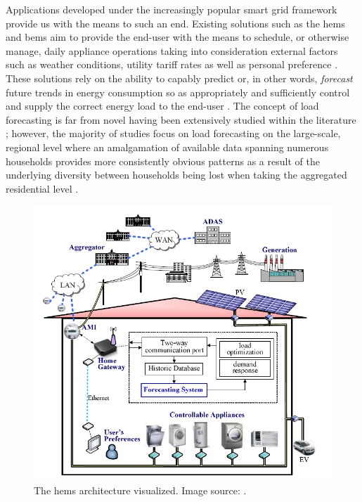 \noindent \newline Applications developed under the increasingly popular smart grid framework provide us with the means to such an end. Existing solutions such as the \gls{hems} and \gls{bems} aim to provide the end-user with the means to schedule, or otherwise manage, daily appliance operations taking into consideration external factors such as weather conditions, utility tariff rates as well as personal preference \cite{Yildiz}. These solutions rely on the ability to capably predict or, in other words, \textit{forecast} future trends in energy consumption \cite{Kareem} so as appropriately and sufficiently control and supply the correct energy load to the end-user \cite{Raza}. The concept of load forecasting is far from novel having been extensively studied within the literature \cite{Foucquier}; however, the majority of studies focus on load forecasting on the large-scale, regional level where an amalgamation of available data spanning numerous households provides more consistently obvious patterns as a result of the underlying diversity between households being lost when taking the aggregated residential level \cite{Kong}.

\begin{figure}[hbt!]
    \centering
    \includegraphics[width=\textwidth]{Images/Chapter 1/Yang/HEMS-Architecture.PNG}
    \caption{The \gls{hems} architecture visualized. Image source: \cite{Yang} .}
    \label{fig:HEMS-Architecture}
\end{figure}

